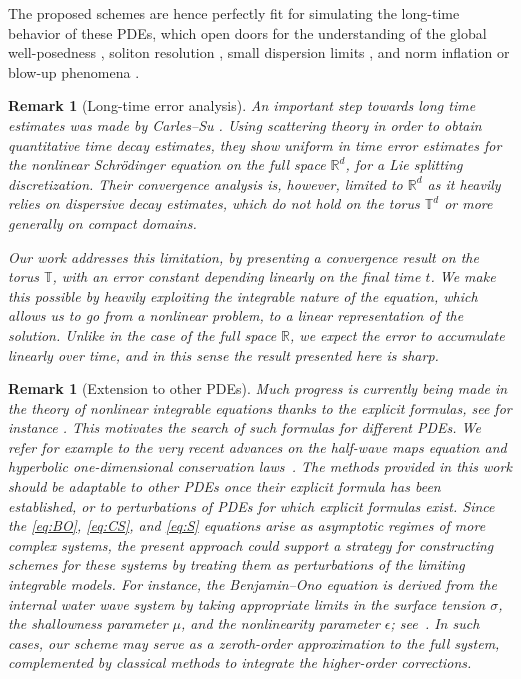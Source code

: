 \documentclass [11pt] {article}
\newtheorem{rem}[thm]{Remark}
\begin{document}
The proposed schemes are hence perfectly fit for simulating the long-time behavior of these PDEs, which open doors for the understanding of the global well-posedness \cite{Bad24}, soliton resolution \cite{IT19, KK24}, small dispersion limits \cite{Bad24.3, Ga23.1, BGGM24-2}, and norm inflation or blow-up phenomena  \cite{GG17, BE22, HK24, KKK24}.

\begin{rem}[Long-time error analysis]\label{rem:longtime}
An important step
towards long time estimates was made by Carles--Su \cite{CS22b}. Using scattering theory in order to obtain quantitative time decay estimates, they show uniform in time error estimates for the nonlinear Schr\"odinger equation on the full space $\mathbb{R}^d$, for a Lie splitting discretization. Their convergence analysis is, however, limited to  $\mathbb{R}^d$ as it heavily relies on dispersive decay estimates, which do not hold on the torus $\mathbb{T}^d$ or more generally on compact domains. 

Our work addresses this limitation, by presenting a convergence result on the torus $\mathbb{T}$, 
with an error constant depending linearly on the final time $t$. We make this possible by heavily exploiting the integrable nature of the equation, which allows us to go from a nonlinear problem, to a linear representation of the solution. 
Unlike in the case of the full space $\mathbb{R}$, 
we expect the error to accumulate linearly over time, and in this sense the result presented here is sharp.
\end{rem}

\begin{rem}[Extension to other PDEs]
Much progress is currently being made in the theory of nonlinear integrable equations thanks to the explicit formulas, see for instance \cite{Bad24.3,Bad24.2, BGGM24-1, BGGM24-2}. This motivates the search of such formulas for different PDEs. We refer for example to  the very recent advances on the half-wave maps equation \cite{GL24} and hyperbolic one-dimensional conservation laws~\cite{C25}. The methods provided in this work should be adaptable to other PDEs once their explicit formula has been established, or to perturbations of PDEs for which explicit formulas exist. Since the \eqref{eq:BO}, \eqref{eq:CS}, and \eqref{eq:S} equations arise as asymptotic regimes of more complex systems, the present approach could support a strategy for constructing schemes for these systems by treating them as perturbations of the limiting integrable models.
For instance, the Benjamin--Ono equation is derived from the {\it internal water wave system} by taking appropriate limits in the surface tension $\sigma$, the shallowness parameter $\mu$, and the nonlinearity parameter $\epsilon$; see~\cite{P24}.
In such cases, our scheme may serve as a zeroth-order approximation to the full system, complemented by classical methods to integrate the higher-order corrections.
\end{rem}
\end{document}
